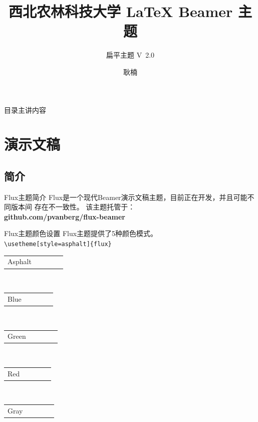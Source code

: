 \documentclass[t, aspectratio=169]{ctexbeamer}
\title[Flux Beamer 主题] %
{西北农林科技大学 {\LaTeX}  Beamer 主题}
\subtitle{扁平主题 V\ 2.0}
\date{\tosemester} %
\author[N. Geng] %
{耿楠}
\institute[
智能媒体] %
{%
  \cie
}
\begin{document}
\titlepage
\begin{frame}[allowframebreaks]{目录}{主讲内容}
 \tableofcontents
\end{frame}

\section{演示文稿}

\subsection{简介}

\begin{frame}{Flux主题}{简介}
  \justifying
  Flux是一个现代Beamer演示文稿主题，目前正在开发，并且可能不同版本间
  存在不一致性。 该主题托管于：\\[0.3cm]
  \centering\textbf{github.com/pvanberg/flux-beamer}
\end{frame}

\def\beamer@mytheme@style{green}
\begin{frame}[fragile]{Flux主题}{颜色设置}
  \centering
  Flux主题提供了5种颜色模式。\\
  \verb+\usetheme[style=asphalt]{flux}+\\[0.8cm]
  \newcommand{\colorRow}[1]{
    \begin{tabular}{p{4cm}cccc}
      #1 & \cellcolor{primary}\hspace*{1cm} &\cellcolor{primaryLight}\hspace*{1cm}&\cellcolor{secondary}\hspace*{1cm}&\cellcolor{tertiary}\hspace*{1cm}\\
    \end{tabular}
  }
  \colorRow{Asphalt}\\[0.3cm]
  \colorRow{Blue}\\[0.3cm]
  \colorRow{Green}\\[0.3cm]
  \colorRow{Red}\\[0.3cm]
  \colorRow{Gray}\\[0.3cm]
\end{frame}
\end{document}
